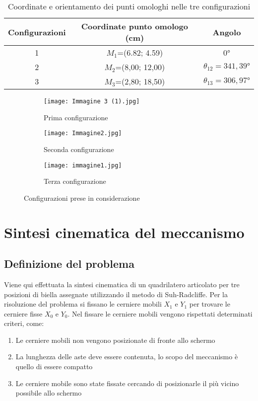 \documentclass{article}
\begin{document}
\begin{table} [h!]
    \centering
    \begin{tabular}{c|c|c}
    \hline
         Configurazioni & Coordinate punto omologo (cm) & Angolo \\
         \hline
         1 & $M_1$=(6.82; 4.59) & 0° \\
         \hline
         2 &$ M_2$=(8,00; 12,00) & $\theta_{12} = 341,39°$ \\
         \hline
         3 & $M_3$=(2,80; 18,50) & $\theta_{13} = 306,97°$ \\
         \hline
    \end{tabular}
    \caption{Coordinate e orientamento dei punti omologhi nelle tre configurazioni}
    \label{tabella1}
\end{table}

\begin{figure} [h!]
    \begin{subfigure}{0.5\textwidth}
        \texttt{[image: Immagine 3 (1).jpg]}
        \caption{Prima configurazione}
        \label{config1}
    \end{subfigure}
    \begin{subfigure}{0.5\textwidth}
        \texttt{[image: Immagine2.jpg]}
        \caption{Seconda configurazione}
        \label{config2}
    \end{subfigure}
    \begin{subfigure}{0.5\textwidth}
        \texttt{[image: immagine1.jpg]}
        \caption{Terza configurazione}
        \label{config3}
    \end{subfigure}
    \caption{Configurazioni prese in considerazione}
    \label{configurazioni}
\end{figure}

\section{Sintesi cinematica del meccanismo}
\subsection{Definizione del problema}
Viene qui effettuata la sintesi cinematica di un quadrilatero articolato per tre posizioni di biella
assegnate utilizzando il metodo di Suh-Radcliffe. Per la risoluzione del problema si fissano le cerniere mobili $X_1$ e $Y_1$ per trovare le cerniere fisse $X_0$ e $Y_0$.
Nel fissare le cerniere mobili vengono rispettati determinati criteri, come:
\begin{enumerate}
    \item Le cerniere mobili non vengono posizionate di fronte allo schermo
    \item La lunghezza delle aste deve essere contenuta, lo scopo del meccanismo è quello di essere compatto %
    \item Le cerniere mobile sono state fissate cercando di posizionarle il più vicino possibile allo schermo
\end{enumerate}
\end{document}
